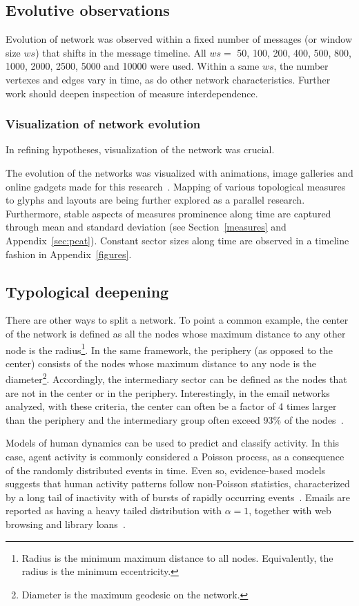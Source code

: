 \documentclass[%
 aip,
 jmp,%
 amsmath,amssymb,
 reprint,%
]{revtex4-1}
\begin{document}
   \subsection{Evolutive observations}
Evolution of network was observed within a fixed number of messages (or window size $ws$) that shifts in the message timeline.
 All $ws=$ 50, 100, 200, 400, 500, 800, 1000, 2000, 2500, 5000 and 10000 were used. Within a same $ws$, the number vertexes and edges vary in time, as do other network characteristics. Further work should deepen inspection of measure interdependence.

        \subsubsection*{Visualization of network evolution}
In refining hypotheses, visualization of the network was crucial.

The evolution of the networks was visualized with animations, image galleries and online gadgets made for this research~\cite{animacoes,galGMANE,appGMANE}. Mapping of various topological measures to glyphs and layouts are being further explored as a parallel research. Furthermore, stable aspects of measures prominence along time are captured through mean and standard deviation (see Section~\ref{measures} and Appendix~\ref{sec:pcat}). Constant sector sizes along time are observed in a timeline fashion in Appendix~\ref{figures}.


    \subsection{Typological deepening}
There are other ways to split a network. To point a common example, the center of the network is defined as all the nodes whose maximum distance to any other node is the radius\footnote{Radius is the minimum maximum distance to all nodes. Equivalently, the radius is the minimum eccentricity.}. 
In the same framework, the periphery (as opposed to the center) consists of the nodes whose maximum distance to any node is the diameter\footnote{Diameter is the maximum geodesic on the network.}. Accordingly, the intermediary sector can be defined as the nodes that are not in the center or in the periphery. Interestingly, in the email networks analyzed, with these criteria, the center can often be a factor of 4 times larger than the periphery and the intermediary group often exceed 93\% of the nodes~\cite{networkx}.

Models of human dynamics can be used to predict and classify activity. In this case, agent activity is commonly considered a Poisson process, as a consequence of the randomly distributed events in time. Even so, evidence-based models suggests that human activity patterns follow non-Poisson statistics, characterized by a long tail of inactivity with of bursts of rapidly occurring events~\cite{barabasiHumanDyn,barabasiPhone}. Emails are reported as having a heavy tailed distribution with $\alpha=1$, together with web browsing and library loans~\cite{barabasiHumanDyn}.
\end{document}

